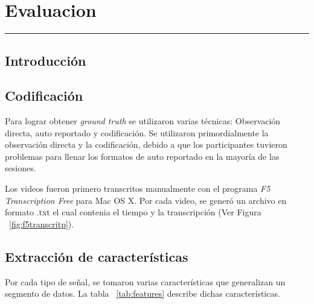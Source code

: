 
\chapter{Evaluacion}\label{capit:cap4}
\vspace{-2.0325ex}%
\noindent
\rule{\textwidth}{0.5pt}
\vspace{-5.5ex}%
\newcommand{\pushline}{\Indp}%

\section{Introducci\'on}\label{cap4:intro}

\section{Codificaci\'on}
Para lograr obtener \textit{ground truth} se utilizaron varias t\'ecnicas: Observaci\'on directa, auto reportado y codificaci\'on. Se utilizaron primordialmente la observaci\'on directa y la codificaci\'on, debido a que los participantes tuvieron problemas para llenar los formatos de auto reportado en la mayor\'ia de las sesiones.

Los videos fueron primero transcritos manualmente con el programa \textit{F5 Transcription Free} para Mac OS X. Por cada video, se gener\'o un archivo en formato .txt el cual contenia el tiempo y la transcripci\'on (Ver Figura ~\ref{fig:f5transcritp}). 


\section{Extracci\'on de caracter\'isticas}
Por cada tipo de se\~nal, se tomaron varias caracter\'isticas que generalizan un segmento de datos. La tabla ~\ref{tab:features} describe dichas caracter\'isticas.


